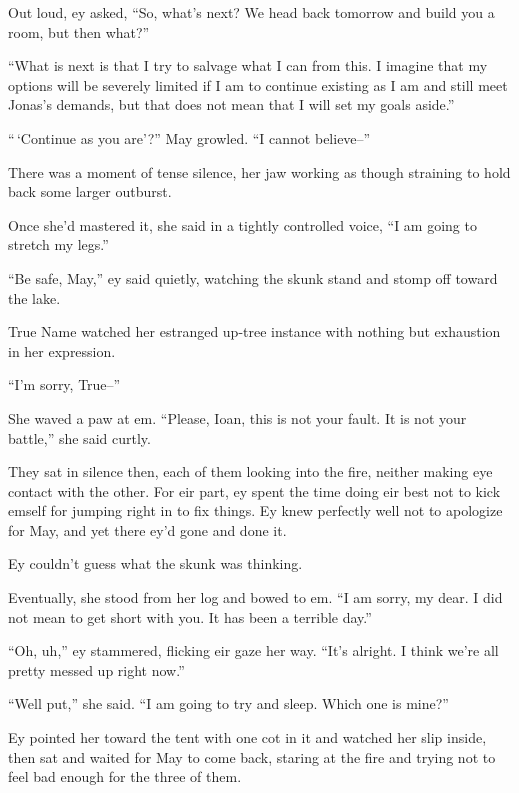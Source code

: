 Out loud, ey asked, ``So, what's next? We head back tomorrow and build you a room, but then what?''

``What is next is that I try to salvage what I can from this. I imagine that my options will be severely limited if I am to continue existing as I am and still meet Jonas's demands, but that does not mean that I will set my goals aside.''

``\,`Continue as you are'?'' May growled. ``I cannot believe--''

There was a moment of tense silence, her jaw working as though straining to hold back some larger outburst.

Once she'd mastered it, she said in a tightly controlled voice, ``I am going to stretch my legs.''

``Be safe, May,'' ey said quietly, watching the skunk stand and stomp off toward the lake.

True Name watched her estranged up-tree instance with nothing but exhaustion in her expression.

``I'm sorry, True--''

She waved a paw at em. ``Please, Ioan, this is not your fault. It is not your battle,'' she said curtly.

They sat in silence then, each of them looking into the fire, neither making eye contact with the other. For eir part, ey spent the time doing eir best not to kick emself for jumping right in to fix things. Ey knew perfectly well not to apologize for May, and yet there ey'd gone and done it.

Ey couldn't guess what the skunk was thinking.

Eventually, she stood from her log and bowed to em. ``I am sorry, my dear. I did not mean to get short with you. It has been a terrible day.''

``Oh, uh,'' ey stammered, flicking eir gaze her way. ``It's alright. I think we're all pretty messed up right now.''

``Well put,'' she said. ``I am going to try and sleep. Which one is mine?''

Ey pointed her toward the tent with one cot in it and watched her slip inside, then sat and waited for May to come back, staring at the fire and trying not to feel bad enough for the three of them.
